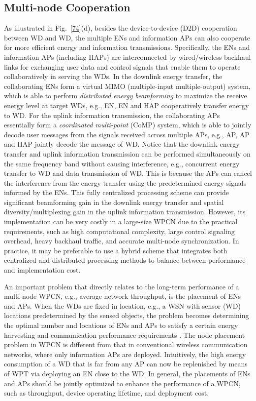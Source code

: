 \documentclass[journal, draftcls, one column, 12pt]{IEEEtran}
\begin{document}
\subsection{Multi-node Cooperation}
As illustrated in Fig.~\ref{74}(d), besides the device-to-device (D2D) cooperation between WD and WD, the multiple ENs and information APs can also cooperate for more efficient energy and information transmissions. Specifically, the ENs and information APs (including HAPs) are interconnected by wired/wireless backhaul links for exchanging user data and control signals that enable them to operate collaboratively in serving the WDs. In the downlink energy transfer, the collaborating ENs form a virtual MIMO (multiple-input multiple-output) system, which is able to perform \emph{distributed energy beamforming} to maximize the receive energy level at target WDs, e.g., EN, EN and HAP cooperatively transfer energy to WD. For the uplink information transmission, the collaborating APs essentially form a \emph{coordinated multi-point} (CoMP) system, which is able to jointly decode user messages from the signals received across multiple APs, e.g., AP, AP and HAP jointly decode the message of WD. Notice that the downlink energy transfer and uplink information transmission can be performed simultaneously on the same frequency band without causing interference, e.g., concurrent energy transfer to WD and data transmission of WD. This is because the APs can cancel the interference from the energy transfer using the predetermined energy signals informed by the ENs. This fully centralized processing scheme can provide significant beamforming gain in the downlink energy transfer and spatial diversity/multiplexing gain in the uplink information transmission. However, its implementation can be very costly in a large-size WPCN due to the practical requirements, such as high computational complexity, large control signaling overhead, heavy backhaul traffic, and accurate multi-node synchronization. In practice, it may be preferable to use a hybrid scheme that integrates both centralized and distributed processing methods to balance between performance and implementation cost.

An important problem that directly relates to the long-term performance of a multi-node WPCN, e.g., average network throughput, is the placement of ENs and APs. When the WDs are fixed in location, e.g., a WSN with sensor (WD) locations predetermined by the sensed objects, the problem becomes determining the optimal number and locations of ENs and APs to satisfy a certain energy harvesting and communication performance requirements \cite{2015:Bi1}. The node placement problem in WPCN is different from that in conventional wireless communication networks, where only information APs are deployed. Intuitively, the high energy consumption of a WD that is far from any AP can now be replenished by means of WPT via deploying an EN close to the WD. In general, the placements of ENs and APs should be jointly optimized to enhance the performance of a WPCN, such as throughput, device operating lifetime, and deployment cost.
\end{document}
